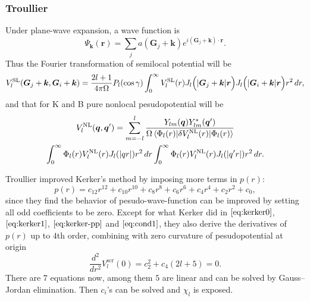 
\subsubsection{Troullier}
\label{sssec:troullier}

Under plane-wave expansion, a wave function is
\begin{equation}
	\Psi_{\bm{k}} (\bm{r}) = \sum_{j}
	a (\bm{G}_j + \bm{k}) e^{i (\bm{G}_j + \bm{k}) \cdot \bm{r}}.
\end{equation}
Thus the Fourier transformation of semilocal potential will be
\begin{equation}
	V_l^\text{SL} (\bm{G}_j + \bm{k}, \bm{G}_i + \bm{k})
	= \frac{ 2l+1 }{ 4\pi \Omega } P_l (\cos \gamma)
	\int_{0}^{\infty} V_l^\text{SL} (r)
	J_l \Big(\abs{\bm{G}_j + \bm{k}} \bm{r} \Big)
	J_l \Big(\abs{\bm{G}_i + \bm{k}} \bm{r} \Big) r^2 \, dr,
\end{equation}
and that for K and B pure nonlocal pesudopotential will be
\begin{multline}
	V_l^\text{NL} (\bm{q}, \bm{q}')
	= \sum_{m = -l}^{l}
	\frac{ Y_{lm} (\bm{q}) Y_{lm}^\ast (\bm{q}') }{ \Omega
		\braket{ \Phi_{l} (r) | \delta V_l^\text{NL} (r) | \Phi_{l} (r) }} \\
	\int_{0}^{\infty} \Phi_{l} (r) V_l^\text{NL} (r) J_l (\abs{q r}) r^2 \, dr
	\int_{0}^{\infty} \Phi_{l} (r) V_l^\text{NL} (r) J_l (\abs{q' r}) r^2 \, dr.
\end{multline}







Troullier\cite{Troullier:1991ey} improved Kerker's method \cite{Kerker:1980cs} by imposing more
terms in $p(r)$:
\begin{equation}
	p(r) = c_{12} r^{12} + c_{10} r^{10} + c_8 r^8 + c_6 r^6 + c_4 r^4 + c_2 r^2 + c_0,
\end{equation}
since they find the behavior of pesudo-wave-function can be improved by setting all odd coefficients
to be zero. Except for what Kerker did in $\eqref{eq:kerker0}$, $\eqref{eq:kerker1}$,
$\eqref{eq:kerker-pp}$ and $\eqref{eq:cond1}$,
they also derive the derivatives of $p(r)$ up to $4$th order,
combining with zero curvature of pesudopotential at origin
\begin{equation}
	\frac{ d^2 }{ d r^2 } V_l^\text{scr} (0) = c_2^2 + c_4 (2 l + 5) = 0.
\end{equation}
There are $7$ equations now, among them $5$ are linear and can be solved by Gauss--Jordan
elimination.
Then $c_i$'s can be solved and $\chi_l$ is exposed.


